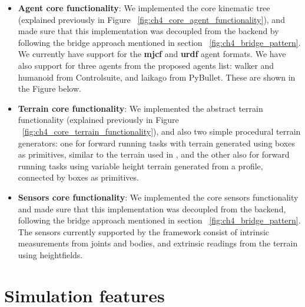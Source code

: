 \begin{itemize}
    \item \textbf{Agent core functionality}: We implemented the core kinematic 
            tree (explained previously in Figure ~\ref{fig:ch4_core_agent_functionality}), 
            and made sure that this implementation was decoupled from the backend by
            following the bridge approach mentioned in section ~\ref{fig:ch4_bridge_pattern}.
            We currently have support for the \textbf{mjcf} and \textbf{urdf} agent 
            formats. We have also support for three agents from the proposed agents list:
            walker and humanoid from Controlsuite, and laikago from PyBullet. These
            are shown in the Figure below.

            \figSupportedAgents

    \item \textbf{Terrain core functionality}: We implemented the abstract terrain
           functionality (explained previously in Figure ~\ref{fig:ch4_core_terrain_functionality}),
           and also two simple procedural terrain generators: one for forward running
           tasks with terrain generated using boxes as primitives, similar to the
           terrain used in \cite{DeepmindEmergenceLocomotion}, and the other also
           for forward running tasks using variable height terrain generated from a
           profile, connected by boxes as primitives.

           \figSupportedTerrain
    \newpage
    \item \textbf{Sensors core functionality}: We implemented the core sensors
          functionality and made sure that this implementation was decoupled from
          the backend, following the bridge approach mentioned in section ~\ref{fig:ch4_bridge_pattern}.
          The sensors currently supported by the framework consist of intrinsic
          measurements from joints and bodies, and extrinsic readings from the
          terrain using heightfields.

          \figSupportedSensors

\end{itemize}



\section{Simulation features}


